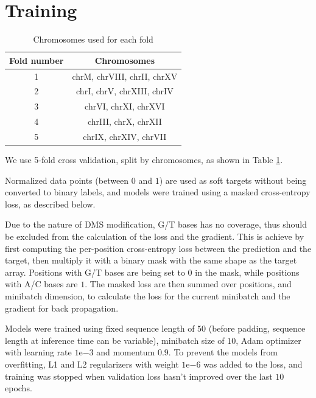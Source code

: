 \documentclass{proposal}
\begin{document}
\section{Training}


\begin{table}[h!]
    \centering
    \begin{tabular}{||c c||}
        \hline
        Fold number & Chromosomes \\ [0.5ex]
        \hline\hline
        1 & chrM, chrVIII, chrII, chrXV \\
        \hline
        2 & chrI, chrV, chrXIII, chrIV \\
        \hline
        3 & chrVI, chrXI, chrXVI \\
        \hline
        4 & chrIII, chrX, chrXII \\
        \hline
        5 & chrIX, chrXIV, chrVII \\ [1ex]
        \hline
    \end{tabular}
    \caption{Chromosomes used for each fold}
    \label{table:fold_chrom_split}
\end{table}


We use 5-fold cross validation, split by chromosomes, as shown in Table \ref{table:fold_chrom_split}.

Normalized data points (between $0$ and $1$) are used as soft targets without being converted to binary labels,
and models were trained using a masked cross-entropy loss, as described below.

Due to the nature of DMS modification, G/T bases has no coverage,
thus should be excluded from the calculation of the loss and the gradient.
This is achieve by first computing the per-position cross-entropy loss between the prediction and the target,
then multiply it with a binary mask with the same shape as the target array.
Positions with G/T bases are being set to $0$ in the mask, while positions with A/C bases are $1$.
The masked loss are then summed over positions, and minibatch dimension,
to calculate the loss for the current minibatch and the gradient for back propagation.

Models were trained using fixed sequence length of $50$ (before padding, sequence length at inference time can be variable),
minibatch size of $10$, Adam optimizer with learning rate $1\mathrm{e}{-3}$ and momentum $0.9$.
To prevent the models from overfitting, L1 and L2 regularizers with weight $1\mathrm{e}{-6}$ was added to the loss,
and training was stopped when validation loss hasn't improved over the last $10$ epochs.
\end{document}
